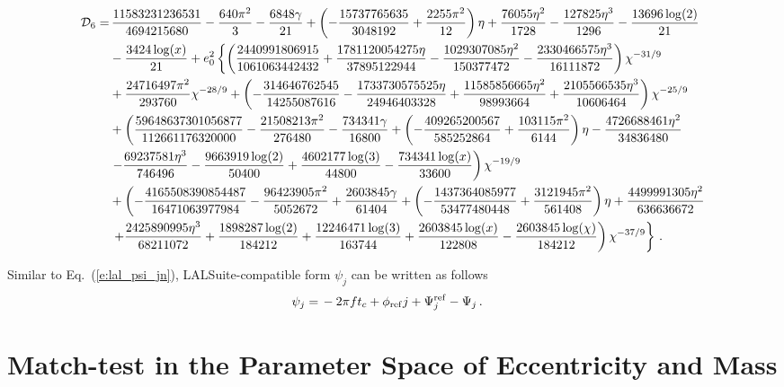 \documentclass[aps,prd,twocolumn,superscriptaddress,groupedaddress,nofootinbib,showpacs,eqsecnum,useAms]{revtex4-2}
\begin{document}
\begin{widetext}
\begin{subequations}
\begin{align}
{\cal D}_6=& \, \frac{11583231236531}{4694215680} - \frac{640 \pi^2}{3} - \frac{6848 \gamma}{21} + \left( -\frac{15737765635}{3048192} + \frac{2255 \pi^2}{12} \right) \eta + \frac{76055 \eta^2}{1728} - \frac{127825 \eta^3}{1296} - \frac{13696 \log(2)}{21} \notag \\
& - \frac{3424 \log(x)}{21} + e_0^2 \left\{ \left( \frac{2440991806915}{1061063442432} + \frac{1781120054275 \eta}{37895122944} - \frac{1029307085 \eta^2}{150377472} - \frac{2330466575 \eta^3}{16111872} \right) \chi^{-31/9} \right. \notag \\
& + \frac{24716497 \pi^2}{293760} \chi^{-28/9} + \left( -\frac{314646762545}{14255087616} - \frac{1733730575525 \eta}{24946403328} + \frac{11585856665 \eta^2}{98993664} + \frac{2105566535 \eta^3}{10606464} \right) \chi^{-25/9} \notag \\
& + \left( \frac{59648637301056877}{112661176320000} - \frac{21508213 \pi^2}{276480} - \frac{734341 \gamma}{16800} + \left( -\frac{409265200567}{585252864} + \frac{103115 \pi^2}{6144} \right) \eta - \frac{4726688461 \eta^2}{34836480} \right. \notag \\
& \left. - \frac{69237581 \eta^3}{746496} - \frac{9663919 \log(2)}{50400} + \frac{4602177 \log(3)}{44800} - \frac{734341 \log(x)}{33600} \right) \chi^{-19/9} \notag \\
& + \left( -\frac{4165508390854487}{16471063977984} - \frac{96423905 \pi^2}{5052672} + \frac{2603845 \gamma}{61404} + \left( -\frac{1437364085977}{53477480448} + \frac{3121945 \pi^2}{561408} \right) \eta + \frac{4499991305 \eta^2}{636636672} \right. \notag \\
& \left. \left. + \frac{2425890995 \eta^3}{68211072} + \frac{1898287 \log(2)}{184212} + \frac{12246471 \log(3)}{163744} + \frac{2603845 \log(x)}{122808} - \frac{2603845 \log(\chi)}{184212} \right) \chi^{-37/9} \right\}\,.
\end{align}
\end{subequations}
\end{widetext}

Similar to Eq.~(\ref{e:lal_psi_jn}), LALSuite-compatible form $\psi_j$ can be written as follows
\begin{align}
\label{e:lal_psi_j}
\psi_{j} =& \, -2 \pi  f t_c+\phi_{\rm ref}j + \Psi_{j}^{\rm ref} - \Psi_{j}\,.
\end{align}

\section{Match-test in the Parameter Space of Eccentricity and Mass}\label{sec:match_test_appendix}
\end{document}
